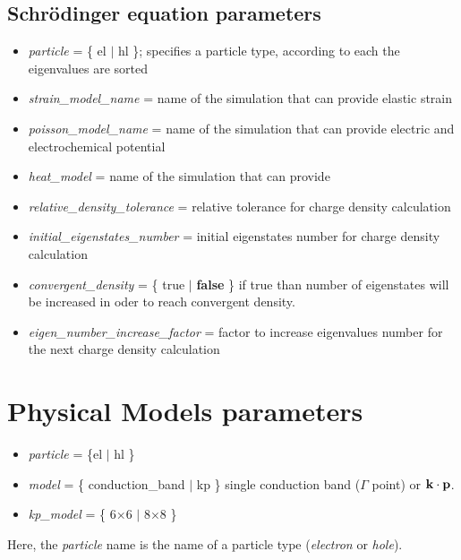  
 

 
\subsection{Schr\"odinger equation parameters}

\begin{itemize}
\item 
\textit{particle}  = \{ el $\vert$ hl \}; specifies a particle type, according to each the eigenvalues are sorted
\item
\textit{strain\_model\_name} = name of the simulation that can provide elastic strain
\item
\textit{poisson\_model\_name} = name of the simulation that can provide electric and electrochemical potential
\item
\textit{heat\_model} = name of the simulation that can provide
\item
\textit{relative\_density\_tolerance} = relative tolerance for charge density calculation 
\item
\textit{initial\_eigenstates\_number} = initial eigenstates number for charge density calculation 
\item
\textit{convergent\_density} = \{ true $\vert$ \textbf{false} \} if true than number of eigenstates will be increased in oder to reach convergent density.
\item 
\textit{eigen\_number\_increase\_factor} = factor to increase eigenvalues number for the next charge density calculation 

\end{itemize}


\section{Physical Models parameters}

\begin{itemize}
\item
\textit{particle} = \{el $\vert$ hl \}  
\item
\textit{model} = \{ conduction\_band $\vert$ kp \} single conduction band ($\Gamma$ point) or ${\bf k \cdot p}$.
\item
\textit{kp\_model} = \{ 6$\times$6 $\vert$ 8$\times$8 \}
\end{itemize}

Here,  the \textit{particle} name is  the name  of  a particle type (\textit{electron} or  \textit{hole}).

